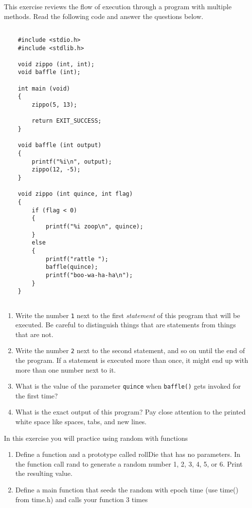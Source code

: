 \begin{exercise}
This exercise reviews the flow of execution through a program
with multiple methods.  Read the following code and answer the
questions below.

\begin{verbatim}

    #include <stdio.h>
    #include <stdlib.h>
    
    void zippo (int, int);
    void baffle (int);
    
    int main (void)
    {
        zippo(5, 13);
        
        return EXIT_SUCCESS;
    }
    
    void baffle (int output)
    {
        printf("%i\n", output);
        zippo(12, -5);
    }
    
    void zippo (int quince, int flag)
    {
        if (flag < 0)
        {
            printf("%i zoop\n", quince);
        }
        else
        {
            printf("rattle ");
            baffle(quince);
            printf("boo-wa-ha-ha\n");
        }
    }
    
\end{verbatim}
%
\begin{enumerate}

\item Write the number {\tt 1} next to the first {\em statement}
of this program that will be executed.  Be careful to distinguish
things that are statements from things that are not.

\item Write the number {\tt 2} next to the second statement, and so on
until the end of the program.  If a statement is executed more than
once, it might end up with more than one number next to it.

\item What is the value of the parameter {\tt quince} when {\tt baffle()}
gets invoked for the first time?

\item What is the exact output of this program? Pay close attention to the printed white space like spaces, tabs, and new lines.

\end{enumerate}

\end{exercise}

\begin{exercise}
	In this exercise you will practice using random with functions
	
		\begin{enumerate}
		\item Define a function and a prototype called rollDie that has no parameters. 
	In the function call rand to generate a random number 1, 2, 3, 4, 5, or 6. Print the resulting value.
	
	\item Define a main function that seeds the random with epoch time (use time() from time.h) and calls your function 3 times
		\end{enumerate}
\end{exercise}

